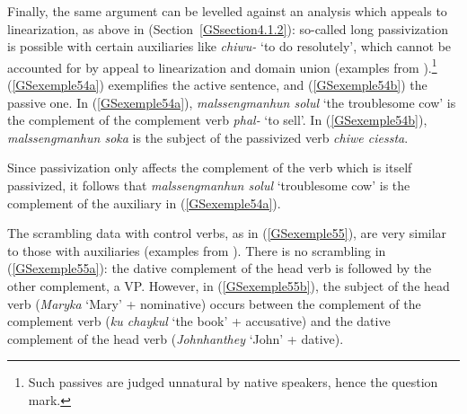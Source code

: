 \zl

\largerpage
\noindent
Finally, the same argument can be levelled against an analysis which appeals to linearization, as
above in  (Section~\ref{GSsection4.1.2}): so-called long passivization is possible with
certain auxiliaries like \emph{chiwu-} `to do resolutely', which cannot be accounted for by appeal
to linearization and domain union (examples from \citealt[164]{Chung98a-u}).\footnote{Such passives
  are judged unnatural by native speakers, hence the question mark.} (\ref{GSexemple54a})
exemplifies the active sentence, and (\ref{GSexemple54b}) the passive one. In (\ref{GSexemple54a}),
\emph{malssengmanhun solul} `the troublesome cow' is the complement of the complement verb
\emph{phal-} `to sell'. In (\ref{GSexemple54b}), \emph{malssengmanhun soka} is the subject of the
passivized verb \emph{chiwe ciessta}.

\eal
	\label{GSexemple54} 
	\label{GSexemple54a}
		
	\label{GSexemple54b}
\zl

\noindent
Since passivization only affects the complement of the verb which is itself passivized, it follows that \emph{malssengmanhun solul} `troublesome cow' is the complement of the auxiliary in (\ref{GSexemple54a}).

The scrambling data with control verbs, as in (\ref{GSexemple55}), are very similar to those with auxiliaries (examples from \citealt[189--190]{Chung98a-u}). There is no scrambling in (\ref{GSexemple55a}): the dative complement of the head verb is followed
by the other complement, a VP. However, in (\ref{GSexemple55b}), the subject of the head verb
(\emph{Maryka} `Mary' + nominative) occurs between the complement of the complement verb (\emph{ku
  chaykul} `the book' + accusative) and the dative complement of the head verb (\emph{Johnhanthey} `John' + dative).

